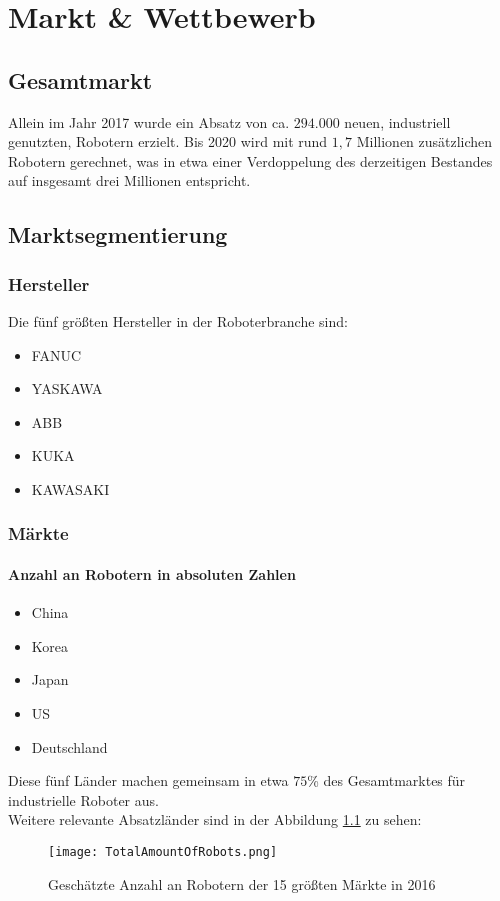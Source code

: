 \chapter{Markt \& Wettbewerb}
\label{sec:Marketing}

\section{Gesamtmarkt}
Allein im Jahr 2017 wurde ein Absatz von ca. $294.000$ neuen, industriell genutzten, Robotern erzielt. Bis 2020 wird mit rund $1,7$ Millionen zusätzlichen Robotern gerechnet, was in etwa einer Verdoppelung des derzeitigen Bestandes auf insgesamt drei Millionen entspricht.

\section{Marktsegmentierung}
\subsection{Hersteller}
Die fünf größten Hersteller in der Roboterbranche sind:
\begin{itemize}
\item FANUC
\item YASKAWA
\item ABB
\item KUKA
\item KAWASAKI
\end{itemize}

\subsection{Märkte}
\subsubsection{Anzahl an Robotern in absoluten Zahlen}
\begin{itemize}
\item China
\item Korea
\item Japan
\item US
\item Deutschland
\end{itemize}
Diese fünf Länder machen gemeinsam in etwa $75$\% des Gesamtmarktes für industrielle Roboter aus.\\
Weitere relevante Absatzländer sind in der Abbildung \ref{fig:TotalAmountOfRobots} zu sehen:
\begin{figure}[h]
	\centering
	\texttt{[image: TotalAmountOfRobots.png]}
	\caption{Geschätzte Anzahl an Robotern der 15 größten Märkte in 2016}
	\label{fig:TotalAmountOfRobots}
\end{figure}
